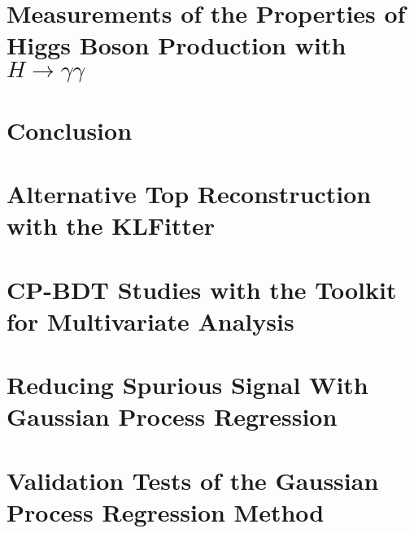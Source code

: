 \documentclass[thesis,openany]{./tex/thesis-umich}
\begin{document}
\chapter{Measurements of the Properties of Higgs Boson Production with $H \rightarrow \gamma \gamma$} \label{chap:couplings_chapter}
	 

\chapter{Conclusion} \label{chap:conclusion}
	 




\appendix

\chapter{Alternative Top Reconstruction with the KLFitter} \label{app:KLFitter}
	

\chapter{CP-BDT Studies with the Toolkit for Multivariate Analysis} \label{app:TMVABDT}
	

\chapter{Reducing Spurious Signal With Gaussian Process Regression} \label{app:gpr_templates}
	

\chapter{Validation Tests of the Gaussian Process Regression Method} \label{app:gpr_validation}
	




\end{document}
